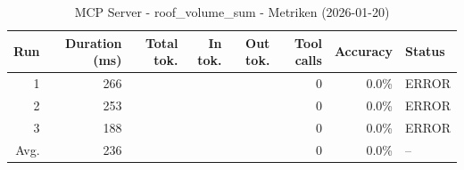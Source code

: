 \begin{table}[ht]
\centering
\small
\caption{MCP Server - roof\_volume\_sum - Metriken (2026-01-20)}
\label{tab:mcp\_roof\_volume\_sum\_metrics\_2026-01-20}
\begin{tabular}{r r r r r r r l}
\hline
Run & Duration (ms) & Total tok. & In tok. & Out tok. & Tool calls & Accuracy & Status \\
\hline
1 & 266 &  &  &  & 0 & 0.0\% & ERROR \\
2 & 253 &  &  &  & 0 & 0.0\% & ERROR \\
3 & 188 &  &  &  & 0 & 0.0\% & ERROR \\
\hline
Avg. & 236 &  &  &  & 0 & 0.0\% & -- \\
\hline
\end{tabular}
\end{table}
